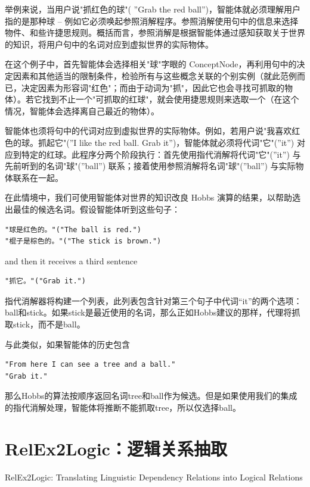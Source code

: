 举例来说，当用户说"抓红色的球"( ”Grab the red ball”)，智能体就必须理解用户指的是那种球 – 例如它必须唤起参照消解程序。参照消解使用句中的信息来选择物件、和些许捷思规则。概括而言，参照消解是根据智能体通过感知获取关于世界的知识，将用户句中的名词对应到虚拟世界的实际物体。

在这个例子中，首先智能体会选择相关"球"字眼的 ConceptNode，再利用句中的决定因素和其他适当的限制条件，检验所有与这些概念关联的个别实例（就此范例而已，决定因素为形容词"红色"；而由于动词为"抓"，因此它也会寻找可抓取的物体）。若它找到不止一个"可抓取的红球"，就会使用捷思规则来选取一个（在这个情况，智能体会选择离自己最近的物体）。

智能体也须将句中的代词对应到虚拟世界的实际物体。例如，若用户说"我喜欢红色的球。抓起它"(”I like the red ball. Grab it”)，智能体就必须将代词"它"(”it”) 对应到特定的红球。此程序分两个阶段执行：首先使用指代消解将代词"它"(”it”) 与先前听到的名词"球"(”ball”) 联系；接着使用参照消解将名词"球"(”ball”) 与实际物体联系在一起。

在此情境中，我们可使用智能体对世界的知识改良 Hobbs 演算的结果，以帮助选出最佳的候选名词。假设智能体听到这些句子：


\begin{verbatim}
"球是红色的。"("The ball is red.")
"棍子是棕色的。"("The stick is brown.") 

\end{verbatim}

\noindent and then it receives a third sentence

\begin{verbatim}
"抓它。"("Grab it.")
\end{verbatim}

指代消解器将构建一个列表，此列表包含针对第三个句子中代词“it”的两个选项：ball和stick。如果stick是最近使用的名词，那么正如Hobbs建议的那样，代理将抓取stick，而不是ball。

与此类似，如果智能体的历史包含

\begin{verbatim}
"From here I can see a tree and a ball."
"Grab it."
\end{verbatim}

那么Hobbs的算法按顺序返回名词tree和ball作为候选。但是如果使用我们的集成的指代消解处理，智能体将推断不能抓取tree，所以仅选择ball。


\section{RelEx2Logic：逻辑关系抽取}{RelEx2Logic: Translating Linguistic Dependency Relations into Logical Relations}

